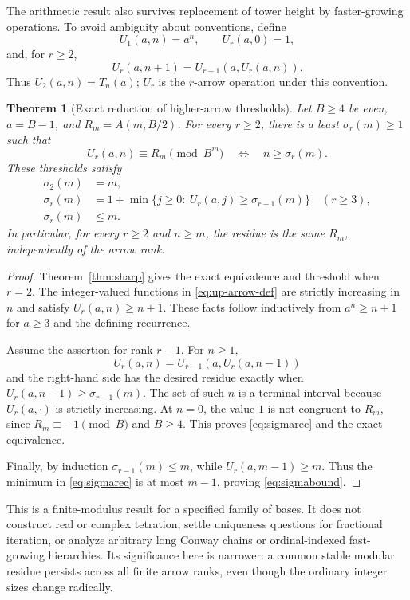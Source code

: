 \documentclass[11pt,letterpaper]{article}
\numberwithin{equation}{section}
\newtheorem{theorem}{Theorem}[section]
\theoremstyle{definition}
\theoremstyle{remark}
\begin{document}
The arithmetic result also survives replacement of tower height by faster-growing operations. To avoid ambiguity about conventions, define
\[
 U_1(a,n)=a^n,\qquad U_r(a,0)=1,
\]
and, for $r\ge2$,
\begin{equation}\label{eq:up-arrow-def}
 U_r(a,n+1)=U_{r-1}(a,U_r(a,n)).
\end{equation}
Thus $U_2(a,n)=T_n(a)$; $U_r$ is the $r$-arrow operation under this convention.

\begin{theorem}[Exact reduction of higher-arrow thresholds]\label{thm:arrows}
Let $B\ge4$ be even, $a=B-1$, and $R_m=A(m,B/2)$. For every $r\ge2$, there is a least $\sigma_r(m)\ge1$ such that
\[
 U_r(a,n)\equiv R_m\pmod{B^m}
 \quad\Longleftrightarrow\quad n\ge\sigma_r(m).
\]
These thresholds satisfy
\begin{align}
 \sigma_2(m)&=m,\label{eq:sigma2}\\
 \sigma_r(m)&=1+\min\{j\ge0:\ U_r(a,j)\ge\sigma_{r-1}(m)\}
 \quad(r\ge3),\label{eq:sigmarec}\\
 \sigma_r(m)&\le m.\label{eq:sigmabound}
\end{align}
In particular, for every $r\ge2$ and $n\ge m$, the residue is the same $R_m$, independently of the arrow rank.
\end{theorem}
\begin{proof}
Theorem~\ref{thm:sharp} gives the exact equivalence and threshold when $r=2$. The integer-valued functions in \eqref{eq:up-arrow-def} are strictly increasing in $n$ and satisfy $U_r(a,n)\ge n+1$. These facts follow inductively from $a^n\ge n+1$ for $a\ge3$ and the defining recurrence.

Assume the assertion for rank $r-1$. For $n\ge1$,
\[
 U_r(a,n)=U_{r-1}(a,U_r(a,n-1))
\]
and the right-hand side has the desired residue exactly when
$U_r(a,n-1)\ge\sigma_{r-1}(m)$. The set of such $n$ is a terminal interval because $U_r(a,\cdot)$ is strictly increasing. At $n=0$, the value $1$ is not congruent to $R_m$, since $R_m\equiv-1\pmod B$ and $B\ge4$. This proves \eqref{eq:sigmarec} and the exact equivalence.

Finally, by induction $\sigma_{r-1}(m)\le m$, while $U_r(a,m-1)\ge m$. Thus the minimum in \eqref{eq:sigmarec} is at most $m-1$, proving \eqref{eq:sigmabound}.
\end{proof}

This is a finite-modulus result for a specified family of bases. It does not construct real or complex tetration, settle uniqueness questions for fractional iteration, or analyze arbitrary long Conway chains or ordinal-indexed fast-growing hierarchies. Its significance here is narrower: a common stable modular residue persists across all finite arrow ranks, even though the ordinary integer sizes change radically.
\end{document}
